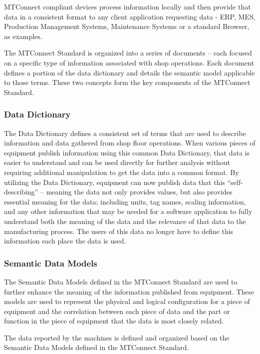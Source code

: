 MTConnect compliant devices process information locally and then provide that data in a consistent format to any client application requesting data - ERP, MES, Production Management Systems, Maintenance Systems or a standard Browser, as examples.

The MTConnect Standard is organized into a series of documents – each focused on a specific type of information associated with shop operations.   Each document defines a portion of the data dictionary and details the semantic model applicable to those terms.   These two concepts form the key components of the MTConnect Standard. 

\subsubsection{Data Dictionary}

The Data Dictionary defines a consistent set of terms that are used to describe information and data gathered from shop floor operations.   When various pieces of equipment publish information using this common Data Dictionary, that data is easier to understand and can be used directly for further analysis without requiring additional manipulation to get the data into a common format.  By utilizing the Data Dictionary, equipment can now publish data that this “self-describing” – meaning the data not only provides values, but also provides essential meaning for the data; including units, tag names, scaling information, and any other information that may be needed for a software application to fully understand both the meaning of the data and the relevance of that data to the manufacturing process.    The users of this data no longer have to define this information each place the data is used. 

\subsubsection{Semantic Data Models}
The Semantic Data Models defined in the MTConnect Standard are used to further enhance the meaning of the information published from equipment.  These models are used to represent the physical and logical configuration for a piece of equipment and the correlation between each piece of data and the part or function in the piece of equipment that the data is most closely related.   

The data reported by the machines is defined and organized based on the Semantic Data Models defined in the MTConnect Standard.   

